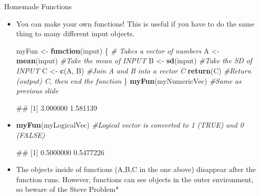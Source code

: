 \documentclass[
  ignorenonframetext,
  aspectratio=169]{beamer}
\newenvironment{Shaded}{\begin{snugshade}}{\end{snugshade}}
\newcommand{\CommentTok}[1]{\textcolor[rgb]{0.56,0.35,0.01}{\textit{#1}}}
\newcommand{\ControlFlowTok}[1]{\textcolor[rgb]{0.13,0.29,0.53}{\textbf{#1}}}
\newcommand{\FunctionTok}[1]{\textcolor[rgb]{0.13,0.29,0.53}{\textbf{#1}}}
\newcommand{\NormalTok}[1]{#1}
\newcommand{\OtherTok}[1]{\textcolor[rgb]{0.56,0.35,0.01}{#1}}
\let\oldShaded\Shaded %
\let\endoldShaded\endShaded
\renewenvironment{Shaded}{\footnotesize\oldShaded}{\endoldShaded}
\let\oldverbatim\verbatim %Change fontsize of code chunk output
\let\endoldverbatim\endverbatim
\renewenvironment{verbatim}{\footnotesize\oldverbatim}{\endoldverbatim}
\begin{document}
\begin{frame}[fragile]{Homemade Functions}
\protect\hypertarget{homemade-functions}{}
\begin{itemize}[<+->]
\item
  You can make your own functions! This is useful if you have to do the
  same thing to many different input objects.

\begin{Shaded}
\begin{Highlighting}[]
\NormalTok{myFun }\OtherTok{\textless{}{-}} \ControlFlowTok{function}\NormalTok{(input) \{}
    \CommentTok{\# Takes a vector of numbers}
\NormalTok{    A }\OtherTok{\textless{}{-}} \FunctionTok{mean}\NormalTok{(input)  }\CommentTok{\#Take the mean of INPUT}
\NormalTok{    B }\OtherTok{\textless{}{-}} \FunctionTok{sd}\NormalTok{(input)  }\CommentTok{\#Take the SD of INPUT}
\NormalTok{    C }\OtherTok{\textless{}{-}} \FunctionTok{c}\NormalTok{(A, B)  }\CommentTok{\#Join A and B into a vector C}
    \FunctionTok{return}\NormalTok{(C)  }\CommentTok{\#Return (output) C, then end the function}
\NormalTok{\}}
\FunctionTok{myFun}\NormalTok{(myNumericVec)  }\CommentTok{\#Same as previous slide}
\end{Highlighting}
\end{Shaded}

\begin{verbatim}
## [1] 3.000000 1.581139
\end{verbatim}
\item
\begin{Shaded}
\begin{Highlighting}[]
\FunctionTok{myFun}\NormalTok{(myLogicalVec)  }\CommentTok{\#Logical vector is converted to 1 (TRUE) and 0 (FALSE)}
\end{Highlighting}
\end{Shaded}

\begin{verbatim}
## [1] 0.5000000 0.5477226
\end{verbatim}
\item
  The objects inside of functions (A,B,C in the one above) disappear
  after the function runs. However, functions can see objects in the
  outer environment, so beware of the Steve Problem*
\end{itemize}
\end{frame}
\end{document}
